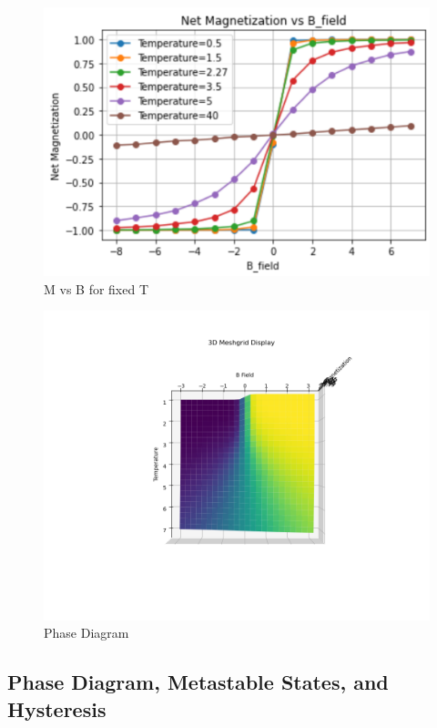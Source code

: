 \documentclass[%
 reprint,
 amsmath,amssymb,
 aps,
]{revtex4-2}
\begin{document}
\begin{figure}
    \centering
    \includegraphics[width=1\linewidth]{1dscans,fixedT.png}
    \caption{M vs B for fixed T}
    \label{fig:1dscans,fixedT}
\end{figure}

\begin{figure}
    \centering
    \includegraphics[width=1\linewidth]{graph_0.png}
    \caption{Phase Diagram}
    \label{fig:phase-diagram}
\end{figure}

\subsection{\label{sec:level2}Phase Diagram, Metastable States, and Hysteresis}
\end{document}
